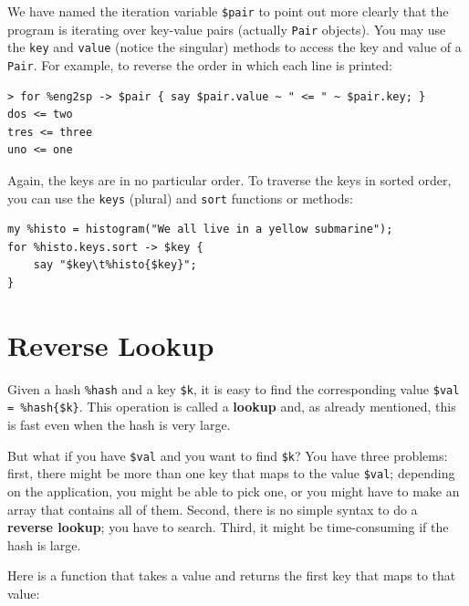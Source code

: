 We have named the iteration variable \verb'$pair' to point 
out more clearly that the program is iterating over key-value 
pairs (actually \verb'Pair' objects). You may use the 
{\tt key} and {\tt value} (notice the singular) methods to 
access the key and value of a \verb'Pair'. For example, to 
reverse the order in which each line is printed:

\begin{verbatim}
> for %eng2sp -> $pair { say $pair.value ~ " <= " ~ $pair.key; }
dos <= two
tres <= three
uno <= one
\end{verbatim}

Again, the keys are in no particular order.  To traverse 
the keys in sorted order, you can use the {\tt keys} 
(plural) and {\tt sort} functions or methods:

\begin{verbatim}
my %histo = histogram("We all live in a yellow submarine");
for %histo.keys.sort -> $key {
    say "$key\t%histo{$key}";
}
\end{verbatim}



\section{Reverse Lookup}
\label{raise}

Given a hash \verb'%hash' and a key \verb'$k', it is easy to
find the corresponding value \verb'$val = %hash{$k}'.  
This operation is called a {\bf lookup} and, as already 
mentioned, this is fast even when the hash is very large.

But what if you have \verb'$val' and you want to find 
\verb'$k'? You have three problems: first, there might be 
more than one key that maps to the value \verb'$val'; depending 
on the application, you might be able to pick one, or you 
might have to make an array that contains all of them.  
Second, there is no simple syntax to do a {\bf reverse lookup}; 
you have to search. Third, it might be time-consuming if 
the hash is large.

Here is a function that takes a value and returns the first
key that maps to that value:	


